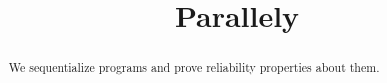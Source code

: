 \documentclass[sigplan,10pt,review,anonymous]{acmart}\settopmatter{printfolios=true,printccs=false,printacmref=false}
\begin{document}
\title{Parallely}

\begin{abstract}
We sequentialize programs and prove reliability properties about them.
\end{abstract}

\maketitle



















\end{document}

